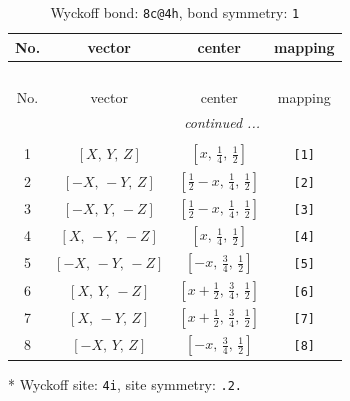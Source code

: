 \documentclass[fleqn,8pt]{jsarticle}
\begin{document}
\renewcommand{\arraystretch}{1.2}
\begin{longtable}{cccc}
\caption{Wyckoff bond: {\tt 8c@4h}, bond symmetry: {\tt 1}}
 \\
 \hline \hline
No. & vector & center & mapping \\ \hline \endfirsthead

\multicolumn{3}{l}{\tablename\ \thetable{}} \\
 \hline \hline
No. & vector & center & mapping \\ \hline \endhead

 \hline \hline
\multicolumn{3}{r}{\footnotesize\it continued ...} \\ \endfoot

 \hline \hline
\multicolumn{3}{r}{} \\ \endlastfoot

1 & $\left[ X,\, Y,\, Z \right]$ & $\left[ x,\, \frac{1}{4},\, \frac{1}{2} \right]$ & {\tt [1]} \\ \hline
2 & $\left[ - X,\, - Y,\, Z \right]$ & $\left[ \frac{1}{2} - x,\, \frac{1}{4},\, \frac{1}{2} \right]$ & {\tt [2]} \\ \hline
3 & $\left[ - X,\, Y,\, - Z \right]$ & $\left[ \frac{1}{2} - x,\, \frac{1}{4},\, \frac{1}{2} \right]$ & {\tt [3]} \\ \hline
4 & $\left[ X,\, - Y,\, - Z \right]$ & $\left[ x,\, \frac{1}{4},\, \frac{1}{2} \right]$ & {\tt [4]} \\ \hline
5 & $\left[ - X,\, - Y,\, - Z \right]$ & $\left[ - x,\, \frac{3}{4},\, \frac{1}{2} \right]$ & {\tt [5]} \\ \hline
6 & $\left[ X,\, Y,\, - Z \right]$ & $\left[ x + \frac{1}{2},\, \frac{3}{4},\, \frac{1}{2} \right]$ & {\tt [6]} \\ \hline
7 & $\left[ X,\, - Y,\, Z \right]$ & $\left[ x + \frac{1}{2},\, \frac{3}{4},\, \frac{1}{2} \right]$ & {\tt [7]} \\ \hline
8 & $\left[ - X,\, Y,\, Z \right]$ & $\left[ - x,\, \frac{3}{4},\, \frac{1}{2} \right]$ & {\tt [8]} \\
\end{longtable}
* Wyckoff site: {\tt 4i}, site symmetry: {\tt .2.}
\renewcommand{\arraystretch}{1.2}
\end{document}
